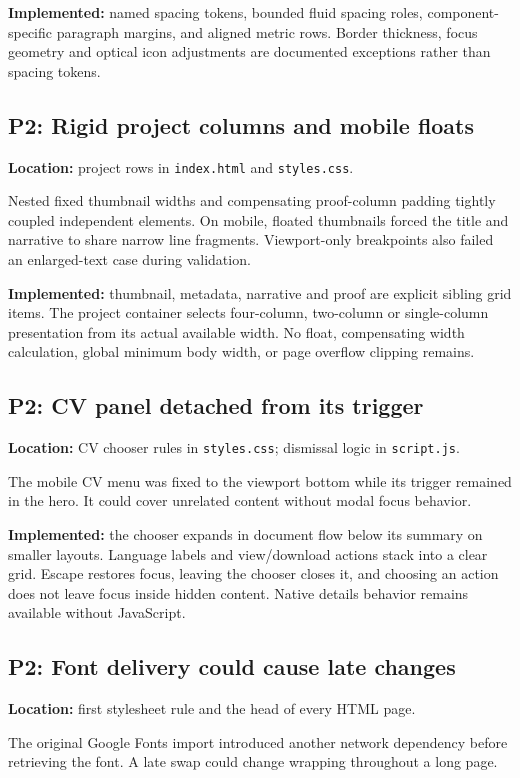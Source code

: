 \documentclass[11pt,a4paper]{article}
\newcommand{\file}[1]{\nolinkurl{#1}}
\begin{document}
\textbf{Implemented:} named spacing tokens, bounded fluid spacing roles, component-specific paragraph margins, and aligned metric rows. Border thickness, focus geometry and optical icon adjustments are documented exceptions rather than spacing tokens.

\subsection{P2: Rigid project columns and mobile floats}
\textbf{Location:} project rows in \file{index.html} and \file{styles.css}.

Nested fixed thumbnail widths and compensating proof-column padding tightly coupled independent elements. On mobile, floated thumbnails forced the title and narrative to share narrow line fragments. Viewport-only breakpoints also failed an enlarged-text case during validation.

\textbf{Implemented:} thumbnail, metadata, narrative and proof are explicit sibling grid items. The project container selects four-column, two-column or single-column presentation from its actual available width. No float, compensating width calculation, global minimum body width, or page overflow clipping remains.

\subsection{P2: CV panel detached from its trigger}
\textbf{Location:} CV chooser rules in \file{styles.css}; dismissal logic in \file{script.js}.

The mobile CV menu was fixed to the viewport bottom while its trigger remained in the hero. It could cover unrelated content without modal focus behavior.

\textbf{Implemented:} the chooser expands in document flow below its summary on smaller layouts. Language labels and view/download actions stack into a clear grid. Escape restores focus, leaving the chooser closes it, and choosing an action does not leave focus inside hidden content. Native details behavior remains available without JavaScript.

\subsection{P2: Font delivery could cause late changes}
\textbf{Location:} first stylesheet rule and the head of every HTML page.

The original Google Fonts import introduced another network dependency before retrieving the font. A late swap could change wrapping throughout a long page.
\end{document}
